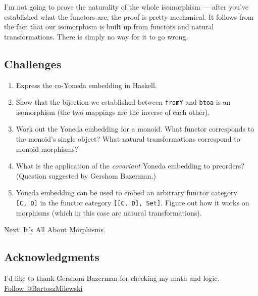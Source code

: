 I'm not going to prove the naturality of the whole isomorphism --- after
you've established what the functors are, the proof is pretty
mechanical. It follows from the fact that our isomorphism is built up
from functors and natural transformations. There is simply no way for it
to go wrong.

\subsection{Challenges}\label{challenges}

\begin{enumerate}
\tightlist
\item
  Express the co-Yoneda embedding in Haskell.
\item
  Show that the bijection we established between \texttt{fromY} and
  \texttt{btoa} is an isomorphism (the two mappings are the inverse of
  each other).
\item
  Work out the Yoneda embedding for a monoid. What functor corresponds
  to the monoid's single object? What natural transformations correspond
  to monoid morphisms?
\item
  What is the application of the \emph{covariant} Yoneda embedding to
  preorders? (Question suggested by Gershom Bazerman.)
\item
  Yoneda embedding can be used to embed an arbitrary functor category
  \texttt{{[}C,\ D{]}} in the functor category
  \texttt{{[}{[}C,\ D{]},\ Set{]}}. Figure out how it works on morphisms
  (which in this case are natural transformations).
\end{enumerate}

Next:
\href{https://bartoszmilewski.com/2015/11/17/its-all-about-morphisms/}{It's
All About Morphisms}.

\subsection{Acknowledgments}\label{acknowledgments}

I'd like to thank Gershom Bazerman for checking my math and logic.\\
\href{https://twitter.com/BartoszMilewski}{Follow @BartoszMilewski}
